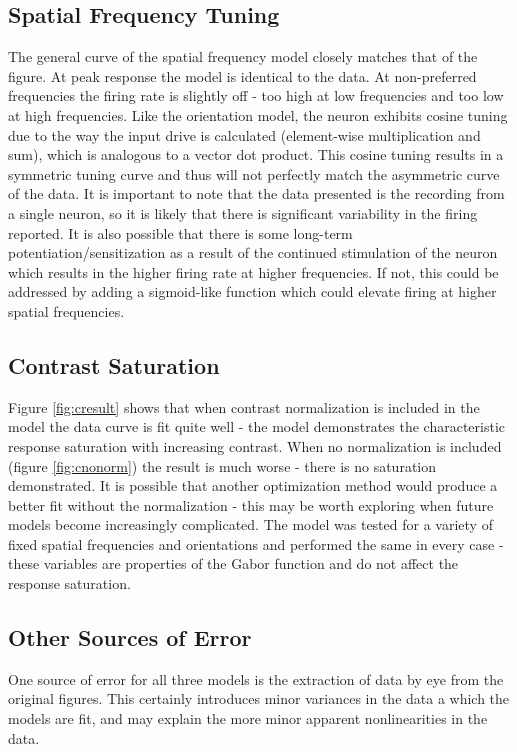 \documentclass{article}
\begin{document}
\subsection{Spatial Frequency Tuning}
The general curve of the spatial frequency model closely matches that of the figure. At peak response the model is identical to the data. At non-preferred frequencies the firing rate is slightly off - too high at low frequencies and too low at high frequencies. Like the orientation model, the neuron exhibits cosine tuning due to the way the input drive is calculated (element-wise multiplication and sum), which is analogous to a vector dot product. This cosine tuning results in a symmetric tuning curve and thus will not perfectly match the asymmetric curve of the data. It is important to note that the data presented is the recording from a single neuron, so it is likely that there is significant variability in the firing reported. It is also possible that there is some long-term potentiation/sensitization as a result of the continued stimulation of the neuron which results in the higher firing rate at higher frequencies. If not, this could be addressed by adding a sigmoid-like function which could elevate firing at higher spatial frequencies.

\subsection{Contrast Saturation}
Figure \ref{fig:cresult} shows that when contrast normalization is included in the model the data curve is fit quite well - the model demonstrates the characteristic response saturation with increasing contrast. When no normalization is included (figure \ref{fig:cnonorm}) the result is much worse - there is no saturation demonstrated. It is possible that another optimization method would produce a better fit without the normalization - this may be worth exploring when future models become increasingly complicated. The model was tested for a variety of fixed spatial frequencies and orientations and performed the same in every case - these variables are properties of the Gabor function and do not affect the response saturation. 

\subsection{Other Sources of Error}
One source of error for all three models is the extraction of data by eye from the original figures. This certainly introduces minor variances in the data a which the models are fit, and may explain the more minor apparent nonlinearities in the data. 
\end{document}
